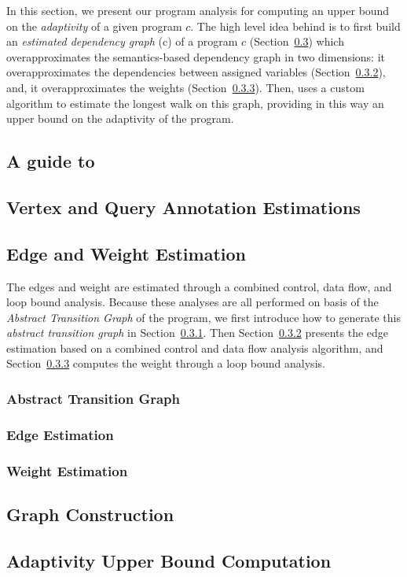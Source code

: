 In this section, we present our program analysis {\THESYSTEM} for
computing an upper bound on the \emph{adaptivity} of a given program
$c$.  The high level idea behind {\THESYSTEM} is to first build
an \emph{estimated dependency graph} \progG(c) of a program $c$
(Section~\ref{sec:alg_weightedgegen}) which overapproximates the
semantics-based dependency graph in two dimensions: it
overapproximates the dependencies between assigned variables (Section~\ref{sec:alg_edgegen}), and, it
overapproximates the weights (Section~\ref{sec:alg_weightgen}). Then, {\THESYSTEM} uses a custom algorithm to estimate the longest
walk on this graph, providing in this way an upper bound on the adaptivity of the
program.
%
\subsection{A guide to {\THESYSTEM}}
\label{sec:alg_guide}


\subsection{Vertex and Query Annotation Estimations}
\label{sec:alg_vertexgen}



\subsection{Edge and Weight Estimation}
\label{sec:alg_weightedgegen}
The edges and weight are estimated through a combined control, data flow, and loop bound analysis.
Because these analyses are all performed on basis of the \emph{Abstract Transition Graph} of the program, we first introduce how to generate this \emph{abstract transition graph} in Section~\ref{sec:alg_abscfg}.
Then Section~\ref{sec:alg_edgegen} presents the edge estimation based on a combined control and data flow analysis algorithm,
and Section~\ref{sec:alg_weightgen}
computes the weight through a loop bound analysis.

\subsubsection{Abstract Transition Graph}
\label{sec:alg_abscfg}

%
\subsubsection{Edge Estimation}
\label{sec:alg_edgegen}

%

\subsubsection{Weight Estimation}
\label{sec:alg_weightgen}

%
%
\subsection{Graph Construction}
\label{sec:alg_graphgen}


\subsection{Adaptivity Upper Bound Computation}
\label{sec:alg_adaptcompute}
